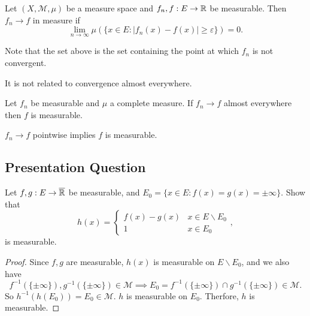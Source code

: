 \documentclass[class=book, crop=false]{standalone}
\begin{document}
        \begin{definition}
            Let $(X, \mathcal{M}, \mu)$ be a measure space and $f_n, f : E \rightarrow \mathbb{R}$ be measurable. Then $f_n \rightarrow f$ in measure if
            \begin{equation*}
                \lim_{n \rightarrow \infty} \mu(\{x \in E : |f_n(x) - f(x)| \geq \varepsilon\}) = 0.
            \end{equation*}
        \end{definition}
        \begin{remark}
            Note that the set above is the set containing the point at which $f_n$ is not convergent.
        \end{remark}
        \begin{remark}
            It is not related to convergence almost everywhere.
        \end{remark}

        \begin{theorem}
            Let $f_n$ be measurable and $\mu$ a complete measure. If $f_n \rightarrow f$ almost everywhere then $f$ is measurable.
        \end{theorem}
        \begin{corollary}
            $f_n \rightarrow f$ pointwise implies $f$ is measurable.
        \end{corollary}
        
        \subsection{Presentation Question}
        \begin{question}
            Let $f, g : E \rightarrow \overline{\mathbb{R}}$ be measurable, and $E_0 = \{x \in E : f(x) = g(x) = \pm\infty\}$. Show that
            \begin{equation*}
                h(x) = \begin{cases}
                    f(x) - g(x) & x \in E \backslash E_0 \\
                    1 & x \in E_0
                \end{cases},
            \end{equation*}
            is measurable.
        \end{question}

        \begin{proof}
            Since $f, g$ are measurable, $h(x)$ is measurable on $E \backslash E_0$, and we also have
            \begin{equation*}
                f^{-1}(\{\pm \infty\}), g^{-1}(\{\pm\infty\}) \in \mathcal{M} \implies E_0 = f^{-1}(\{\pm \infty\}) \cap g^{-1}(\{\pm\infty\}) \in \mathcal{M}.
            \end{equation*}
            So $h^{-1}(h(E_0)) = E_0 \in \mathcal{M}$. $h$ is measurable on $E_0$. Therfore, $h$ is measurable.
        \end{proof}
\end{document}
